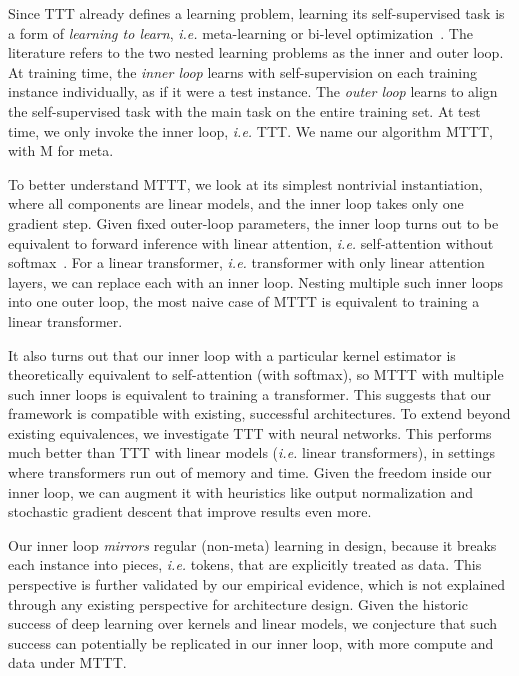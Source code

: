 \documentclass{article}
\begin{document}
Since TTT already defines a learning problem, learning its self-supervised task is a form of \emph{learning to learn}, \textit{i.e.} meta-learning or bi-level optimization~\citep{schmidhuber1987evolutionary}.
The literature refers to the two nested learning problems as the inner and outer loop.
At training time, the \emph{inner loop} learns with self-supervision on each training instance individually, as if it were a test instance. The \emph{outer loop} learns to align the self-supervised task with the main task on the entire training set.
At test time, we only invoke the inner loop, \emph{i.e.} TTT.
We name our algorithm MTTT, with M for meta.

To better understand MTTT, we look at its simplest nontrivial instantiation, 
where all components are linear models, and the inner loop takes only one gradient step.
Given fixed outer-loop parameters, the inner loop turns out to be equivalent to forward inference with linear attention, \textit{i.e.} self-attention without softmax~\citep{katharopoulos2020transformers}.
For a linear transformer, \textit{i.e.} transformer with only linear attention layers, we can replace each with an inner loop.
Nesting multiple such inner loops into one outer loop, the most naive case of MTTT is equivalent to training a linear transformer.

It also turns out that our inner loop with a particular kernel estimator is theoretically equivalent to self-attention (with softmax), so MTTT with multiple such inner loops is equivalent to training a transformer.
This suggests that our framework is compatible with existing, successful architectures.
To extend beyond existing equivalences, we investigate TTT with neural networks.
This performs much better than TTT with linear models (\textit{i.e.} linear transformers), in settings where transformers run out of memory and time.
Given the freedom inside our inner loop, we can augment it with heuristics like output normalization and stochastic gradient descent that improve results even more.

Our inner loop \emph{mirrors} regular (non-meta) learning in design, because it breaks each instance into pieces, \textit{i.e.} tokens, that are explicitly treated as data.
This perspective is further validated by our empirical evidence, which is not explained through any existing perspective for architecture design.
Given the historic success of deep learning over kernels and linear models, we conjecture that such success can potentially be replicated in our inner loop, with more compute and data under MTTT.
\end{document}

